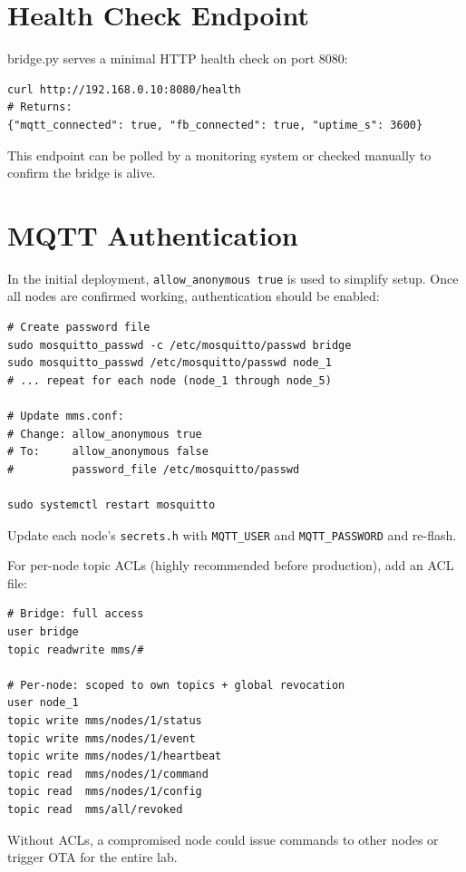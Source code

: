 \section{Health Check Endpoint}

bridge.py serves a minimal HTTP health check on port 8080:

\begin{lstlisting}[style=bashstyle]
curl http://192.168.0.10:8080/health
# Returns:
{"mqtt_connected": true, "fb_connected": true, "uptime_s": 3600}
\end{lstlisting}

This endpoint can be polled by a monitoring system or checked manually to confirm the bridge is alive.

\section{MQTT Authentication}
\label{sec:mqtt_auth}

In the initial deployment, \texttt{allow\_anonymous true} is used to simplify setup. Once all nodes are confirmed working, authentication should be enabled:

\begin{lstlisting}[style=bashstyle]
# Create password file
sudo mosquitto_passwd -c /etc/mosquitto/passwd bridge
sudo mosquitto_passwd /etc/mosquitto/passwd node_1
# ... repeat for each node (node_1 through node_5)

# Update mms.conf:
# Change: allow_anonymous true
# To:     allow_anonymous false
#         password_file /etc/mosquitto/passwd

sudo systemctl restart mosquitto
\end{lstlisting}

Update each node's \texttt{secrets.h} with \texttt{MQTT\_USER} and \texttt{MQTT\_PASSWORD} and re-flash.

For per-node topic ACLs (highly recommended before production), add an ACL file:

\begin{lstlisting}[caption={/etc/mosquitto/acl (per-node topic restrictions)}]
# Bridge: full access
user bridge
topic readwrite mms/#

# Per-node: scoped to own topics + global revocation
user node_1
topic write mms/nodes/1/status
topic write mms/nodes/1/event
topic write mms/nodes/1/heartbeat
topic read  mms/nodes/1/command
topic read  mms/nodes/1/config
topic read  mms/all/revoked
\end{lstlisting}

Without ACLs, a compromised node could issue commands to other nodes or trigger OTA for the entire lab.
